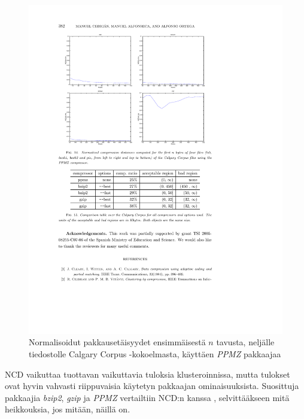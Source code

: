 \documentclass[12pt,finnish,draft]{tktltiki2}
\theoremstyle{definition}
\theoremstyle{remark}
\begin{document}
    \begin{figure}[t]
      \begin{center}
        \immediate{}
      \includegraphics{img/ppmz}
      \end{center}
      \caption{Normalisoidut pakkausetäisyydet ensimmäisestä $n$ tavusta, neljälle tiedostolle Calgary Corpus -kokoelmasta, käyttäen \emph{PPMZ} pakkaajaa \cite{cebrian2005common}}
      \label{fig:ppmz}
    \end{figure}

      NCD vaikuttaa tuottavan vaikuttavia tuloksia klusteroinnissa, mutta tulokset ovat hyvin vahvasti riippuvaisia käytetyn pakkaajan ominaisuuksista.
      Suosittuja pakkaajia \emph{bzip2}, \emph{gzip} ja \emph{PPMZ} vertailtiin NCD:n kanssa \cite{cebrian2005common}, selvittääkseen mitä heikkouksia, jos mitään, näillä on.
\end{document}
